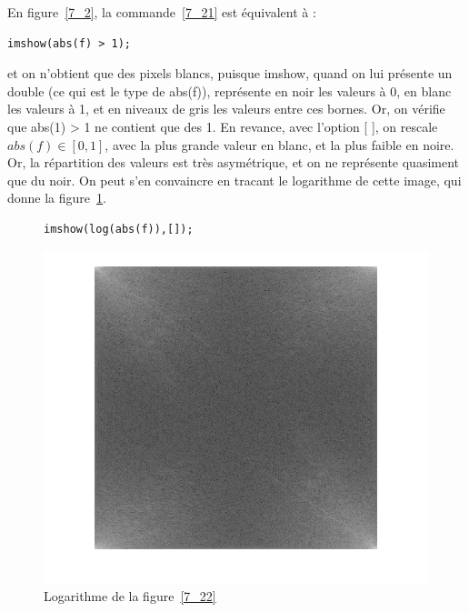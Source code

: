 \documentclass[12pt,a4paper,onecolumn]{article}
\begin{document}
En figure~\ref{7_2}, la commande~\ref{7_21} est équivalent à :
\begin{lstlisting}[numbers = none]
imshow(abs(f) > 1);
\end{lstlisting}
et on n'obtient que des pixels blancs, puisque imshow, quand on lui présente un double (ce qui est le type de abs(f)), représente en noir les valeurs à 0, en blanc les valeurs à 1, et en niveaux de gris les valeurs entre ces bornes. Or, on vérifie que abs(1) > 1 ne contient que des 1. En revance, avec l'option [ ], on rescale \(abs(f) \in [0, 1]\), avec la plus grande valeur en blanc, et la plus faible en noire. Or, la répartition des valeurs est très asymétrique, et on ne représente quasiment que du noir. On peut s'en convaincre en tracant le logarithme de cette image, qui donne la figure~\ref{7_33}.

\begin{figure}[H]
	\centering
	\begin{lstlisting}[frame=none, numbers = none]
	imshow(log(abs(f)),[]);
	\end{lstlisting}
	\includegraphics[height = 0.3\textheight]{7_33}
	\caption{Logarithme de la figure~\ref{7_22}}
	\label{7_33}
\end{figure}
\end{document}
